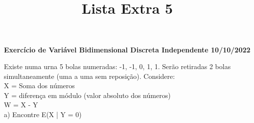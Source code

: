 \documentclass[12pt,a4paper]{article}
\title{Lista Extra 5}
\date{}
\begin{document}
	\maketitle
	\begin{center}
		\textbf{Exercício de Variável Bidimensional Discreta Independente 10/10/2022}
	\end{center}
	Existe numa urna 5 bolas numeradas: -1, -1, 0, 1, 1. Serão retiradas 2 bolas simultaneamente (uma a uma sem reposição). Considere:\\
	X =  Soma dos números\\
	Y = diferença em módulo (valor absoluto dos números)\\
	W = X - Y\\
	a)	Encontre E(X | Y = 0)\\
	\vspace{0.25cm}
\end{document}
